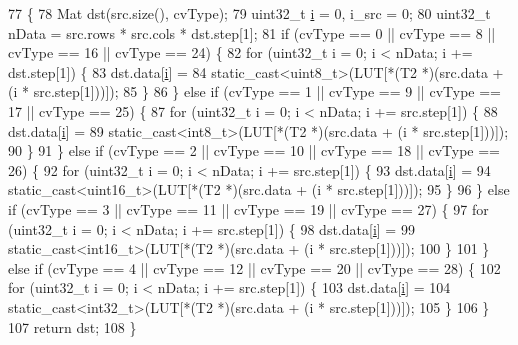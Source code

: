 \begin{DoxyCode}
77                                                           \{
78     Mat dst(src.size(), cvType);
79     uint32\_t \hyperlink{_comparision_pictures_2_createtest_image_8m_a6f6ccfcf58b31cb6412107d9d5281426}{i} = 0, i\_src = 0;
80     uint32\_t nData = src.rows * src.cols * dst.step[1];
81     \textcolor{keywordflow}{if} (cvType == 0 || cvType == 8 || cvType == 16 || cvType == 24) \{
82       \textcolor{keywordflow}{for} (uint32\_t i = 0; i < nData; i += dst.step[1]) \{
83         dst.data[\hyperlink{_comparision_pictures_2_createtest_image_8m_a6f6ccfcf58b31cb6412107d9d5281426}{i}] =
84             \textcolor{keyword}{static\_cast<}uint8\_t\textcolor{keyword}{>}(LUT[*(T2 *)(src.data + (i * src.step[1]))]);
85       \}
86     \} \textcolor{keywordflow}{else} \textcolor{keywordflow}{if} (cvType == 1 || cvType == 9 || cvType == 17 || cvType == 25) \{
87       \textcolor{keywordflow}{for} (uint32\_t i = 0; i < nData; i += src.step[1]) \{
88         dst.data[\hyperlink{_comparision_pictures_2_createtest_image_8m_a6f6ccfcf58b31cb6412107d9d5281426}{i}] =
89             \textcolor{keyword}{static\_cast<}int8\_t\textcolor{keyword}{>}(LUT[*(T2 *)(src.data + (i * src.step[1]))]);
90       \}
91     \} \textcolor{keywordflow}{else} \textcolor{keywordflow}{if} (cvType == 2 || cvType == 10 || cvType == 18 || cvType == 26) \{
92       \textcolor{keywordflow}{for} (uint32\_t i = 0; i < nData; i += src.step[1]) \{
93         dst.data[\hyperlink{_comparision_pictures_2_createtest_image_8m_a6f6ccfcf58b31cb6412107d9d5281426}{i}] =
94             \textcolor{keyword}{static\_cast<}uint16\_t\textcolor{keyword}{>}(LUT[*(T2 *)(src.data + (i * src.step[1]))]);
95       \}
96     \} \textcolor{keywordflow}{else} \textcolor{keywordflow}{if} (cvType == 3 || cvType == 11 || cvType == 19 || cvType == 27) \{
97       \textcolor{keywordflow}{for} (uint32\_t i = 0; i < nData; i += src.step[1]) \{
98         dst.data[\hyperlink{_comparision_pictures_2_createtest_image_8m_a6f6ccfcf58b31cb6412107d9d5281426}{i}] =
99             \textcolor{keyword}{static\_cast<}int16\_t\textcolor{keyword}{>}(LUT[*(T2 *)(src.data + (i * src.step[1]))]);
100       \}
101     \} \textcolor{keywordflow}{else} \textcolor{keywordflow}{if} (cvType == 4 || cvType == 12 || cvType == 20 || cvType == 28) \{
102       \textcolor{keywordflow}{for} (uint32\_t i = 0; i < nData; i += src.step[1]) \{
103         dst.data[\hyperlink{_comparision_pictures_2_createtest_image_8m_a6f6ccfcf58b31cb6412107d9d5281426}{i}] =
104             \textcolor{keyword}{static\_cast<}int32\_t\textcolor{keyword}{>}(LUT[*(T2 *)(src.data + (i * src.step[1]))]);
105       \}
106     \}
107     \textcolor{keywordflow}{return} dst;
108   \}
\end{DoxyCode}


